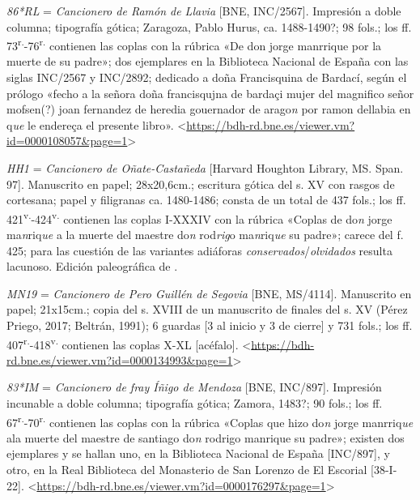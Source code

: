 \documentclass[11pt,a4paper,twoside]{article}
\newcommand{\comillas}[1]{«#1»}
\newcommand{\tsup}[1]{\textsuperscript{#1}}
\begin{document}
\textit{86*RL} = \textit{Cancionero de Ramón de Llavia} [BNE, INC/2567].
%
Impresión a doble columna; tipografía gótica; Zaragoza, Pablo Hurus, ca. 1488-1490?; 98 fols.; los ff. 73\tsup{r.}-76\tsup{r.} contienen las coplas con la rúbrica \comillas{De don jorge manrrique por la muerte de su padre}; dos ejemplares en la Biblioteca Nacional de España con las siglas INC/2567 y INC/2892; dedicado a doña Francisquina de Bardací, según el prólogo \comillas{fecho a la señora doña francisqujna de bardaçi mujer del magnifico señor mofsen(?) joan fernandez de heredia gouernador de arago\textit{n} por ramon dellabia en q\textit{ue} le endereça el presente libro}. <\url{https://bdh-rd.bne.es/viewer.vm?id=0000108057&page=1}>\par

\textit{HH1} = \textit{Cancionero de Oñate-Castañeda} [Harvard Houghton Library, MS. Span. 97].
%
Manuscrito en papel; 28x20,6cm.; escritura gótica del s. XV con rasgos de cortesana; papel y filigranas ca. 1480-1486; consta de un total de 437 fols.; los ff. 421\tsup{v.}-424\tsup{v.} contienen las coplas I-XXXIV con la rúbrica \comillas{Coplas de do\textit{n} jorge ma\textit{n}riq\textit{ue} a la muerte del maestre do\textit{n} rod\textit{rig}o ma\textit{n}riq\textit{ue} su padre}; carece del f. 425; para las cuestión de las variantes adiáforas \textit{conservados}/\textit{olvidados} resulta lacunoso. Edición paleográfica de \textcite{Severin1990}.\par

\textit{MN19} = \textit{Cancionero de Pero Guillén de Segovia} [BNE, MS/4114].
%
Manuscrito en papel; 21x15cm.; copia del s. XVIII de un manuscrito de finales del s. XV (Pérez Priego, 2017; Beltrán, 1991); 6 guardas [3 al inicio y 3 de cierre] y 731 fols.; los ff. 407\tsup{r.}-418\tsup{v.} contienen las coplas X-XL [acéfalo]. <\url{https://bdh-rd.bne.es/viewer.vm?id=0000134993&page=1}>\par

\textit{83*IM} = \textit{Cancionero de fray Íñigo de Mendoza} [BNE, INC/897].
%
Impresión incunable a doble columna; tipografía gótica; Zamora, 1483?; 90 fols.; los ff. 67\tsup{r.}-70\tsup{r.} contienen las coplas con la rúbrica \comillas{Coplas que hizo do\textit{n} jorge manrriq\textit{ue} ala muerte del maestre de santiago do\textit{n} rodrigo manrique su padre}; existen dos ejemplares y se hallan uno, en la Biblioteca Nacional de España [INC/897], y otro, en la Real Biblioteca del Monasterio de San Lorenzo de El Escorial [38-I-22]. <\url{https://bdh-rd.bne.es/viewer.vm?id=0000176297&page=1}>\par
\relax
\vfill
\end{document}
